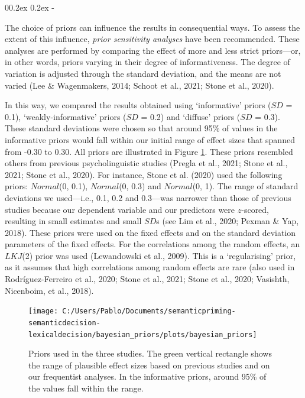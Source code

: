 \documentclass[
  12pt,
  man,floatsintext]{apa7}
\makeatletter
\let\oldsubparagraph\subparagraph
\renewcommand{\subparagraph}[1]{\oldsubparagraph{#1}\mbox{}}
\renewcommand{\subparagraph}[1]{\@startsection{subparagraph}{5}{1em}%
  {0\baselineskip \@plus 0.2ex \@minus 0.2ex}%
  {-\z@\relax}%
  {\normalfont\normalsize\itshape\hspace{\parindent}{#1}\textit{\addperi}}{\relax}}
\makeatother
\begin{document}
\hypertarget{prior-distributions-and-prior-predictive-checks}{%
\subparagraph{Prior distributions and prior predictive checks}\label{prior-distributions-and-prior-predictive-checks}}

The choice of priors can influence the results in consequential ways. To assess the extent of this influence, \emph{prior sensitivity analyses} have been recommended. These analyses are performed by comparing the effect of more and less strict priors---or, in other words, priors varying in their degree of informativeness. The degree of variation is adjusted through the standard deviation, and the means are not varied (Lee \& Wagenmakers, 2014; Schoot et al., 2021; Stone et al., 2020).

In this way, we compared the results obtained using `informative' priors (\(SD\) = 0.1), `weakly-informative' priors (\(SD\) = 0.2) and `diffuse' priors (\(SD\) = 0.3). These standard deviations were chosen so that around 95\% of values in the informative priors would fall within our initial range of effect sizes that spanned from -0.30 to 0.30. All priors are illustrated in Figure \ref{fig:bayesian-priors}. These priors resembled others from previous psycholinguistic studies (Pregla et al., 2021; Stone et al., 2021; Stone et al., 2020). For instance, Stone et al. (2020) used the following priors: \(Normal\)(0, 0.1), \(Normal\)(0, 0.3) and \(Normal\)(0, 1). The range of standard deviations we used---i.e., 0.1, 0.2 and 0.3---was narrower than those of previous studies because our dependent variable and our predictors were \(z\)-scored, resulting in small estimates and small \(SD\)s (see Lim et al., 2020; Pexman \& Yap, 2018). These priors were used on the fixed effects and on the standard deviation parameters of the fixed effects. For the correlations among the random effects, an \(LKJ\)(2) prior was used (Lewandowski et al., 2009). This is a `regularising' prior, as it assumes that high correlations among random effects are rare (also used in Rodríguez-Ferreiro et al., 2020; Stone et al., 2021; Stone et al., 2020; Vasishth, Nicenboim, et al., 2018).

\begin{figure}

{\centering \texttt{[image: C:/Users/Pablo/Documents/semanticpriming-semanticdecision-lexicaldecision/bayesian\_priors/plots/bayesian\_priors]} 

}

\caption{Priors used in the three studies. The green vertical rectangle shows the range of plausible effect sizes based on previous studies and on our frequentist analyses. In the informative priors, around 95\% of the values fall within the range.}\label{fig:bayesian-priors}
\end{figure}
\end{document}
